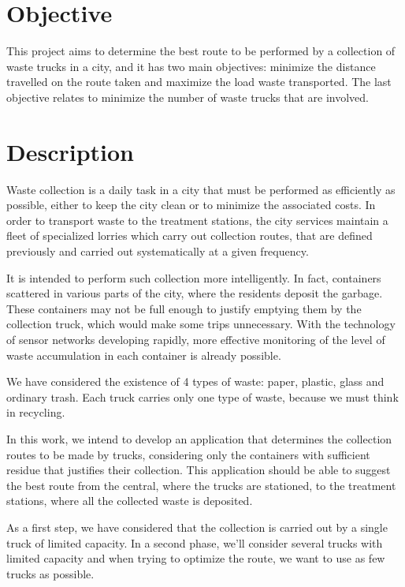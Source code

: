 \documentclass[a4paper]{article}
\begin{document}
\section{Objective}
\label{objective}

This project aims to determine the best route to be performed by a collection of waste trucks in a city, and it has two main objectives: minimize the distance travelled on the route taken and maximize the load waste transported. The last objective relates to minimize the number of waste trucks that are involved.

\section{Description}
\label{description}

Waste collection is a daily task in a city that must be performed as efficiently as possible, either to keep the city clean or to minimize the associated costs. In order to transport waste to the treatment stations, the city services maintain a fleet of specialized lorries which carry out collection routes, that are defined previously and carried out systematically at a given frequency.

It is intended to perform such collection more intelligently. In fact, containers scattered in various parts of the city, where the residents deposit the garbage. These containers may not be full enough to justify emptying them by the collection truck, which would make some trips unnecessary. With the technology of sensor networks developing rapidly, more effective monitoring of the level of waste accumulation in each container is already possible.

We have considered the existence of 4 types of waste: paper, plastic, glass and ordinary trash. Each truck carries only one type of waste, because we must think in recycling.

In this work, we intend to develop an application that determines the collection routes to be made by trucks, considering only the containers with sufficient residue that justifies their collection. This application should be able to suggest the best route from the central, where the trucks are stationed, to the treatment stations, where all the collected waste is deposited.

As a first step, we have considered that the collection is carried out by a single truck of limited capacity. In a second phase, we'll consider several trucks with limited capacity and when trying to optimize the route, we want to use as few trucks as possible.
\end{document}
